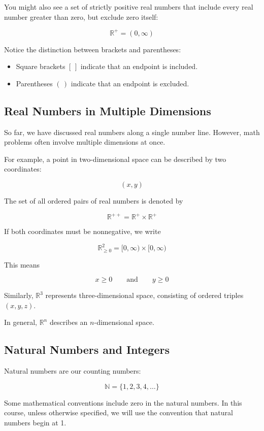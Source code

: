 \documentclass[12pt]{article}
\begin{document}
You might also see a set of strictly positive real numbers that include every real number greater than zero, but exclude zero itself:

\[
\mathbb{R}^+=(0,\infty)
\]

Notice the distinction between brackets and parentheses:

\begin{itemize}
    \item Square brackets $[\,]$ indicate that an endpoint is included.
    \item Parentheses $(\,)$ indicate that an endpoint is excluded.
\end{itemize}

\subsection{Real Numbers in Multiple Dimensions}

So far, we have discussed real numbers along a single number line. However, math problems often involve multiple dimensions at once.

For example, a point in two-dimensional space can be described by two coordinates:

\[
(x,y)
\]

The set of all ordered pairs of real numbers is denoted by

\[
\mathbb{R}^{++}=\mathbb{R}^+\times\mathbb{R}^+
\]

If both coordinates must be nonnegative, we write

\[
\mathbb{R}_{\geq 0}^2
=
[0,\infty)\times[0,\infty)
\]

This means

\[
x\geq 0
\qquad \text{and} \qquad
y\geq 0
\]

Similarly, $\mathbb{R}^3$ represents three-dimensional space, consisting of ordered triples $(x,y,z)$.

In general, $\mathbb{R}^n$ describes an $n$-dimensional space.

\subsection{Natural Numbers and Integers}

Natural numbers are our counting numbers:

\[
\mathbb{N}=\{1,2,3,4,\ldots\}
\]

Some mathematical conventions include zero in the natural numbers. In this course, unless otherwise specified, we will use the convention that natural numbers begin at 1.
\end{document}
